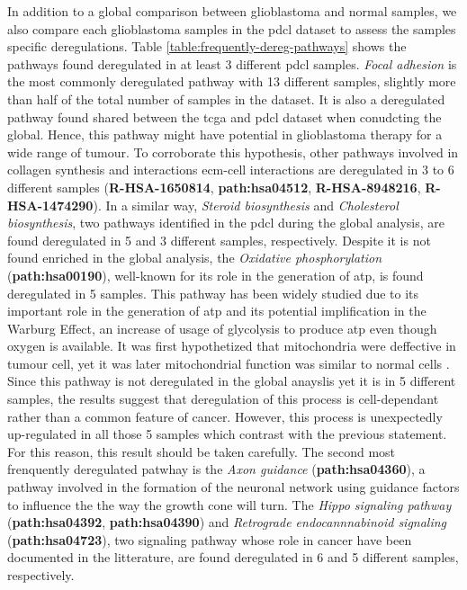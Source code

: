 In addition to a global comparison between glioblastoma and normal samples, we also compare each glioblastoma samples in the \acrshort{pdcl} dataset to assess the samples specific deregulations.
Table \ref*{table:frequently-dereg-pathways} shows the pathways found deregulated in at least 3 different \acrshort{pdcl} samples.
\textit{Focal adhesion} is the most commonly deregulated pathway with 13 different samples, slightly more than half of the total number of samples in the dataset.
It is also a deregulated pathway found shared between the \acrshort{tcga} and \acrshort{pdcl} dataset when conudcting the global.
Hence, this pathway might have potential in glioblastoma therapy for a wide range of tumour.
To corroborate this hypothesis, other pathways involved in collagen synthesis and  interactions \acrshort{ecm}-cell interactions are deregulated in 3 to 6 different samples (\textbf{R-HSA-1650814}, \textbf{path:hsa04512}, \textbf{R-HSA-8948216}, \textbf{R-HSA-1474290}).
In a similar way, \textit{Steroid biosynthesis} and \textit{Cholesterol biosynthesis}, two pathways identified in the \acrshort{pdcl} during the global analysis, are found deregulated in 5 and 3 different samples, respectively.
Despite it is not found enriched in the global analysis, the \textit{Oxidative phosphorylation} (\textbf{path:hsa00190}), well-known for its role in the generation of \acrshort{atp}, is found deregulated in 5 samples.
This pathway has been widely studied due to its important role in the generation of \acrshort{atp} and its potential implification in the Warburg Effect, an increase of usage of glycolysis to produce \acrshort{atp} even though oxygen is available.
It was first hypothetized that mitochondria were deffective in tumour cell, yet it was later mitochondrial function was similar to normal cells \cite*{Cairns2011}.
Since this pathway is not deregulated in the global anayslis yet it is in 5 different samples, the results suggest that deregulation of this process is cell-dependant rather than a common feature of cancer.
However, this process is unexpectedly up-regulated in all those 5 samples which contrast with the previous statement.
For this reason, this result should be taken carefully.
The second most frenquently deregulated patwhay is the \textit{Axon guidance} (\textbf{path:hsa04360}), a pathway involved in the formation of the neuronal network using guidance factors to influence the the way the growth cone will turn.
The \textit{Hippo signaling pathway} (\textbf{path:hsa04392}, \textbf{path:hsa04390}) and \textit{Retrograde endocannnabinoid signaling} (\textbf{path:hsa04723}), two signaling pathway whose role in cancer have been documented in the litterature, are found deregulated in 6 and 5 different samples, respectively.

